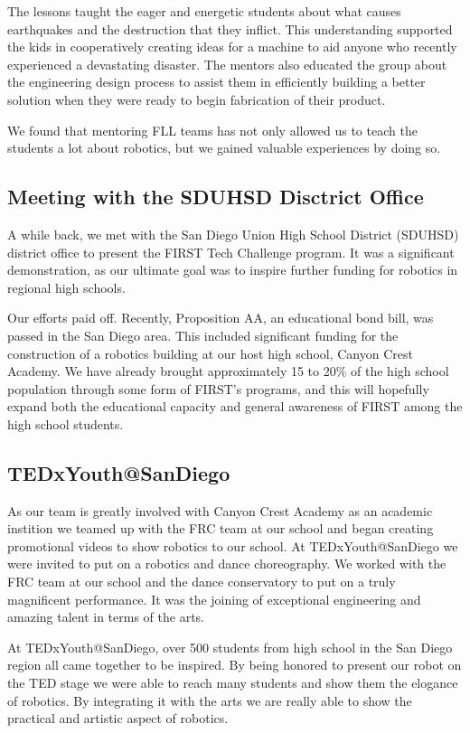 The lessons taught the eager and energetic students about what causes earthquakes and the destruction that they inflict. This understanding supported the kids in cooperatively creating ideas for a machine to aid anyone who recently experienced a devastating disaster. The mentors also educated the group about the engineering design process to assist them in efficiently building a better solution when they were ready to begin fabrication of their product.

We found that mentoring FLL teams has not only allowed us to teach the students a lot about robotics, but we gained valuable experiences by doing so.

\subsection{Meeting with the SDUHSD Disctrict Office}

A while back, we met with the San Diego Union High School District (SDUHSD) district office to present the FIRST Tech Challenge program. It was a significant demonstration, as our ultimate goal was to inspire further funding for robotics in regional high schools.

Our efforts paid off. Recently, Proposition AA, an educational bond bill, was passed in the San Diego area. This included significant funding for the construction of a robotics building at our host high school, Canyon Crest Academy. We have already brought approximately 15 to 20\% of the high school population through some form of FIRST's programs, and this will hopefully expand both the educational capacity and general awareness of FIRST among the high school students.

\subsection{TEDxYouth@SanDiego}
As our team is greatly involved with Canyon Crest Academy as an academic instition we teamed up with the FRC team at our school and began creating promotional videos to show robotics to our school. At TEDxYouth@SanDiego we were invited to put on a robotics and dance choreography. We worked with the FRC team at our school and the dance conservatory to put on a truly magnificent performance. It was the joining of exceptional engineering and amazing talent in terms of the arts. 

At TEDxYouth@SanDiego, over 500 students from high school in the San Diego region all came together to be inspired. By being honored to present our robot on the TED stage we were able to reach many students and show them the elogance of robotics. By integrating it with the arts we are really able to show the practical and artistic aspect of robotics. 

